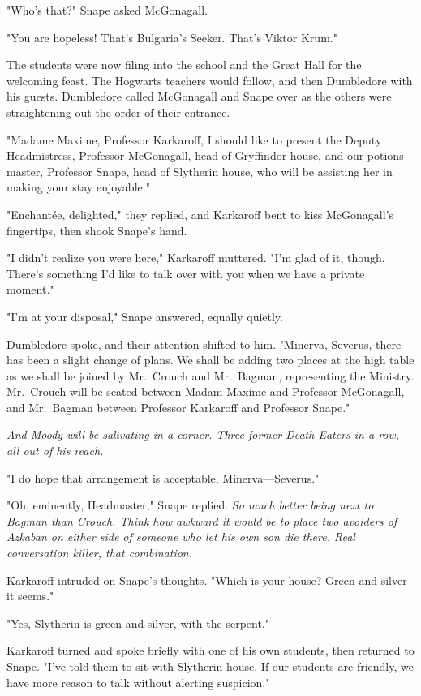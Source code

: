 "Who's that?" Snape asked McGonagall.

"You are hopeless! That's Bulgaria's Seeker. That's Viktor Krum."

The students were now filing into the school and the Great Hall for the welcoming feast. The Hogwarts teachers would follow, and then Dumbledore with his guests. Dumbledore called McGonagall and Snape over as the others were straightening out the order of their entrance.

"Madame Maxime, Professor Karkaroff, I should like to present the Deputy Headmistress, Professor McGonagall, head of Gryffindor house, and our potions master, Professor Snape, head of Slytherin house, who will be assisting her in making your stay enjoyable."

"Enchantée, delighted," they replied, and Karkaroff bent to kiss McGonagall's fingertips, then shook Snape's hand.

"I didn't realize you were here," Karkaroff muttered. "I'm glad of it, though. There's something I'd like to talk over with you when we have a private moment."

"I'm at your disposal," Snape answered, equally quietly.

Dumbledore spoke, and their attention shifted to him. "Minerva, Severus, there has been a slight change of plans. We shall be adding two places at the high table as we shall be joined by Mr.~Crouch and Mr.~Bagman, representing the Ministry. Mr.~Crouch will be seated between Madam Maxime and Professor McGonagall, and Mr.~Bagman between Professor Karkaroff and Professor Snape."

\emph{And Moody will be salivating in a corner. Three former Death Eaters in a row, all out of his reach.}

"I do hope that arrangement is acceptable, Minerva—Severus."

"Oh, eminently, Headmaster," Snape replied. \emph{So much better being next to Bagman than Crouch. Think how awkward it would be to place two avoiders of Azkaban on either side of someone who let his own son die there. Real conversation killer, that combination.}

Karkaroff intruded on Snape's thoughts. "Which is your house? Green and silver it seems."

"Yes, Slytherin is green and silver, with the serpent."

Karkaroff turned and spoke briefly with one of his own students, then returned to Snape. "I've told them to sit with Slytherin house. If our students are friendly, we have more reason to talk without alerting suspicion."

